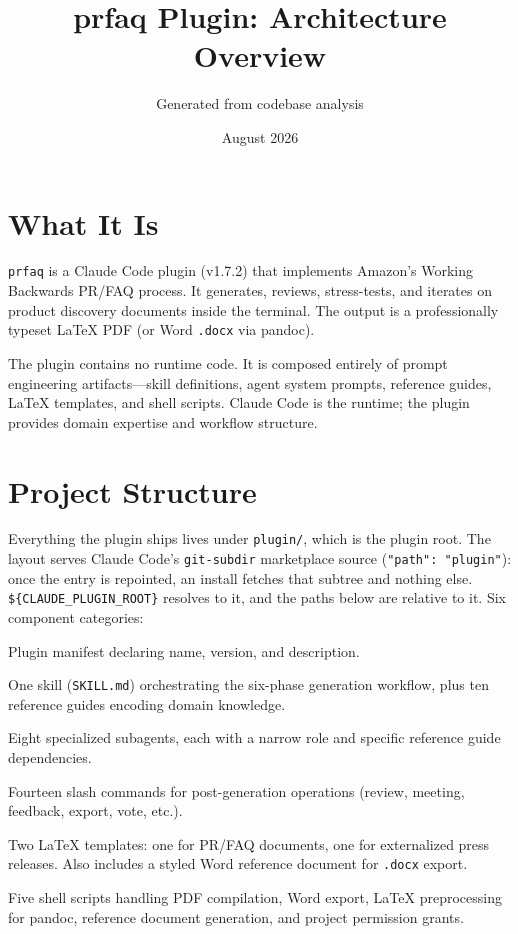 \documentclass[11pt,letterpaper]{article}
\title{\textbf{prfaq Plugin: Architecture Overview}}
\author{Generated from codebase analysis}
\date{August 2026}
\begin{document}
\maketitle

\section{What It Is}

\texttt{prfaq} is a Claude Code plugin (v1.7.2) that implements Amazon's Working
Backwards PR/FAQ process. It generates, reviews, stress-tests, and iterates on
product discovery documents inside the terminal. The output is a professionally
typeset LaTeX PDF (or Word \texttt{.docx} via pandoc).

The plugin contains no runtime code. It is composed entirely of prompt
engineering artifacts---skill definitions, agent system prompts, reference
guides, LaTeX templates, and shell scripts. Claude Code is the runtime; the
plugin provides domain expertise and workflow structure.

\section{Project Structure}

Everything the plugin ships lives under \texttt{plugin/}, which is the plugin
root. The layout serves Claude Code's \texttt{git-subdir} marketplace source
(\texttt{"path": "plugin"}): once the entry is repointed, an install fetches
that subtree and nothing else. \texttt{\$\{CLAUDE\_PLUGIN\_ROOT\}} resolves to
it, and the paths below are relative to it. Six component categories:

\begin{description}[style=nextline, leftmargin=2em]
  \item[\texttt{.claude-plugin/plugin.json}]
    Plugin manifest declaring name, version, and description.

  \item[\texttt{skills/prfaq/}]
    One skill (\texttt{SKILL.md}) orchestrating the six-phase generation
    workflow, plus ten reference guides encoding domain knowledge.

  \item[\texttt{agents/}]
    Eight specialized subagents, each with a narrow role and specific reference
    guide dependencies.

  \item[\texttt{commands/}]
    Fourteen slash commands for post-generation operations (review, meeting,
    feedback, export, vote, etc.).

  \item[\texttt{assets/}]
    Two LaTeX templates: one for PR/FAQ documents, one for externalized press
    releases. Also includes a styled Word reference document for
    \texttt{.docx} export.

  \item[\texttt{scripts/}]
    Five shell scripts handling PDF compilation, Word export, LaTeX
    preprocessing for pandoc, reference document generation, and project
    permission grants.
\end{description}
\end{document}

